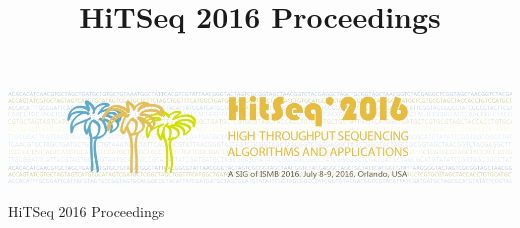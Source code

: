 \documentclass[11pt]{article}
\date{}
\author{}
\title{
  HiTSeq 2016 Proceedings
}
\begin{document}

\begin{center}
\includegraphics[scale=0.5]{hitseq_banner.jpg}

\vspace*{5cm}
\Huge{HiTSeq 2016 Proceedings}
\end{center}
\end{document}
